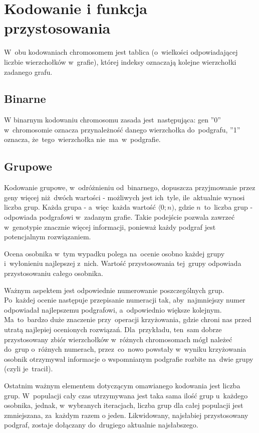 \documentclass[11pt]{aghdpl}
\begin{document}
\chapter{Kodowanie i funkcja przystosowania}
\label{cha:encoding}
W~obu kodowaniach chromosomem jest tablica (o~wielkości odpowiadającej liczbie wierzchołków w~grafie), której 
indeksy oznaczają kolejne wierzchołki zadanego grafu.
\section{Binarne}
\label{sec:binary}
W binarnym kodowaniu chromosomu zasada jest~następująca: gen ''0'' w~chromosomie oznacza przynależność danego wierzchołka 
do~podgrafu, ''1'' oznacza, że~tego~wierzchołka nie~ma~w~podgrafie.
\section{Grupowe}
\label{sec:group}
Kodowanie grupowe, w~odróżnieniu od~binarnego, dopuszcza przyjmowanie przez geny więcej niż~dwóch wartości - możliwych 
jest ich~tyle, ile~aktualnie wynosi liczba grup. Każda grupa - a~więc~każda wartość $\langle0; n)$, gdzie $n$~to~liczba grup - odpowiada 
podgrafowi w~zadanym grafie. Takie podejście pozwala zawrzeć w~genotypie znacznie więcej informacji, ponieważ każdy podgraf jest potencjalnym 
rozwiązaniem. 

Ocena osobnika w~tym wypadku polega na~ocenie osobno każdej grupy i~wyłonieniu najlepszej z~nich. Wartość przystosowania tej~grupy odpowiada przystosowaniu 
całego osobnika.

Ważnym aspektem jest odpowiednie numerowanie poszczególnych grup. Po~każdej ocenie następuje przepisanie numeracji tak, aby~najmniejszy
numer odpowiadał najlepszemu podgrafowi, a~odpowiednio większe kolejnym. Ma~to~bardzo duże znaczenie przy~operacji krzyżowania, gdzie chroni nas 
przed utratą najlepiej ocenionych rozwiązań. Dla~przykładu, ten~sam dobrze przystosowany zbiór wierzchołków w~różnych chromosomach mógł
należeć do~grup o~różnych numerach, przez~co~nowo powstały w~wyniku krzyżowania osobnik otrzymywał informacje o wspomnianym podgrafie rozbite
na~dwie grupy (czyli je~tracił).

Ostatnim ważnym elementem dotyczącym omawianego kodowania jest liczba grup. W~populacji cały czas utrzymywana jest taka sama ilość 
grup u~każdego osobnika, jednak, w~wybranych iteracjach, liczba grup dla całej populacji jest zmniejszana, za~każdym razem o jeden. 
Likwidowany, najsłabiej przystosowany podgraf, zostaje dołączany do~drugiego aktualnie najsłabszego.
\end{document}
